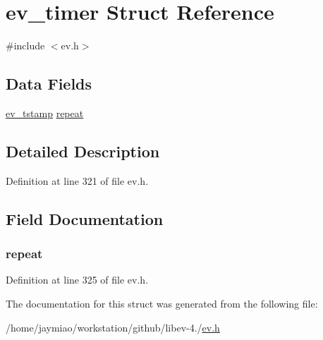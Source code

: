 \hypertarget{structev__timer}{\section{ev\-\_\-timer \-Struct \-Reference}
\label{structev__timer}
}


{\ttfamily \#include $<$ev.\-h$>$}

\subsection*{\-Data \-Fields}
\begin{DoxyCompactItemize}
\item 
\hyperlink{ev_8h_add71e34ce2b04bbf7eb6f31a850814e8}{ev\-\_\-tstamp} \hyperlink{structev__timer_a6113423f01aea60101124c80ace1df52}{repeat}
\end{DoxyCompactItemize}


\subsection{\-Detailed \-Description}


\-Definition at line 321 of file ev.\-h.



\subsection{\-Field \-Documentation}
\hypertarget{structev__timer_a6113423f01aea60101124c80ace1df52}{
\subsubsection[{repeat}]{ {\bf repeat}}}\label{structev__timer_a6113423f01aea60101124c80ace1df52}


\-Definition at line 325 of file ev.\-h.



\-The documentation for this struct was generated from the following file\-:\begin{DoxyCompactItemize}
\item 
/home/jaymiao/workstation/github/libev-\/4./\hyperlink{ev_8h}{ev.\-h}\end{DoxyCompactItemize}
